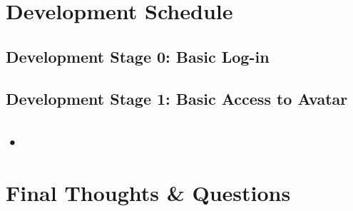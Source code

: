\documentclass[11pt, a4paper]{article}
\begin{document}
\section{Development Schedule}

\subsection{Development Stage 0: Basic Log-in}

\subsection{Development Stage 1: Basic Access to Avatar}

\subsection{•}

\section{Final Thoughts \& Questions}
\end{document}
